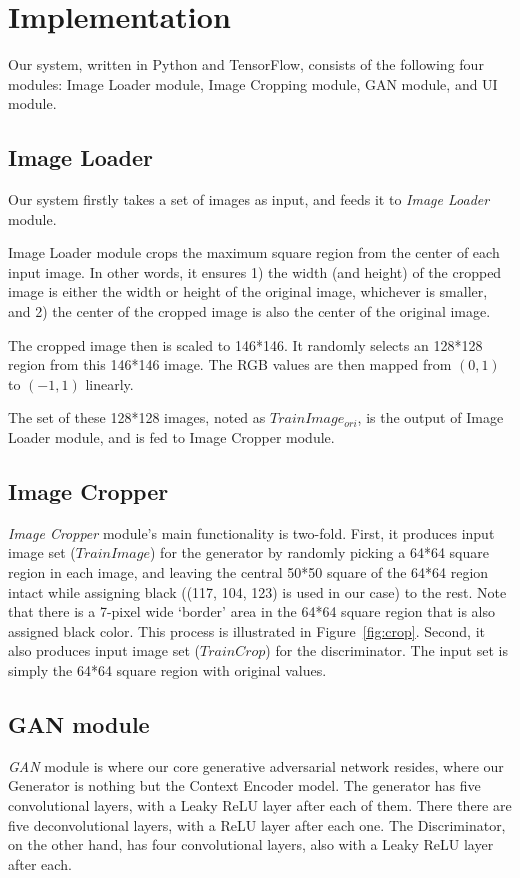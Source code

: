 \documentclass{sig-alternate}
\begin{document}
\section{Implementation}
\label{sec:imple}
Our system, written in Python and TensorFlow, consists of the following four modules: Image Loader module, Image Cropping module, GAN module, and UI module.

\subsection{Image Loader}
Our system firstly takes a set of images as input, and feeds it to \textit{Image Loader} module.

Image Loader module crops the maximum square region from the center of each input image. In other words, it ensures 1) the width (and height) of the cropped image is either the width or height of the original image, whichever is smaller, and 2) the center of the cropped image is also the center of the original image.

The cropped image then is scaled to 146*146. It randomly selects an 128*128 region from this 146*146 image. The RGB values are then mapped from $(0, 1)$ to $(-1, 1)$ linearly.

The set of these 128*128 images, noted as $TrainImage_{ori}$, is the output of Image Loader module, and is fed to Image Cropper module.

\subsection{Image Cropper}
\textit{Image Cropper} module's main functionality is two-fold. First, it produces input image set ($TrainImage$) for the generator by randomly picking a 64*64 square region in each image, and leaving the central 50*50 square of the 64*64 region intact while assigning black ((117, 104, 123) is used in our case) to the rest. Note that there is a 7-pixel wide `border' area in the 64*64 square region that is also assigned black color. This process is illustrated in Figure~\ref{fig:crop}. Second, it also produces input image set ($TrainCrop$) for the discriminator. The input set is simply the 64*64 square region with original values.

\subsection{GAN module}
\textit{GAN} module is where our core generative adversarial network resides, where our Generator is nothing but the Context Encoder model. The generator has five convolutional layers, with a Leaky ReLU layer after each of them. There there are five deconvolutional layers, with a ReLU layer after each one. The Discriminator, on the other hand, has four convolutional layers, also with a Leaky ReLU layer after each.
\end{document}
